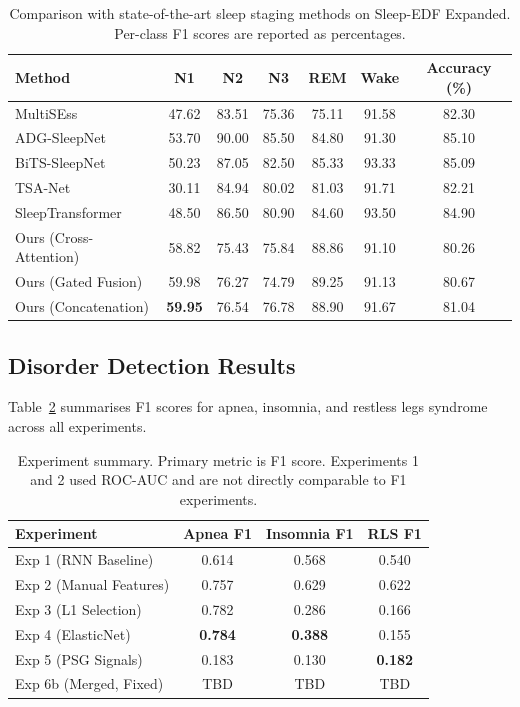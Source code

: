 \begin{table}[h]
\centering
\caption{Comparison with state-of-the-art sleep staging methods on Sleep-EDF Expanded. Per-class F1 scores are reported as percentages.}
\label{tab:sota}
\begin{tabular}{lcccccc}
\toprule
Method & N1 & N2 & N3 & REM & Wake & Accuracy (\%) \\
\midrule
MultiSEss \cite{huang2025mhas} & 47.62 & 83.51 & 75.36 & 75.11 & 91.58 & 82.30 \\
ADG-SleepNet \cite{sun2025adg} & 53.70 & 90.00 & 85.50 & 84.80 & 91.30 & 85.10 \\
BiTS-SleepNet \cite{cong2025bits} & 50.23 & 87.05 & 82.50 & 85.33 & 93.33 & 85.09 \\
TSA-Net \cite{fu2023tsanet} & 30.11 & 84.94 & 80.02 & 81.03 & 91.71 & 82.21 \\
SleepTransformer \cite{phan2022sleeptransformer} & 48.50 & 86.50 & 80.90 & 84.60 & 93.50 & 84.90 \\
\midrule
Ours (Cross-Attention) & 58.82 & 75.43 & 75.84 & 88.86 & 91.10 & 80.26 \\
Ours (Gated Fusion) & 59.98 & 76.27 & 74.79 & 89.25 & 91.13 & 80.67 \\
Ours (Concatenation) & \textbf{59.95} & 76.54 & 76.78 & 88.90 & 91.67 & 81.04 \\
\bottomrule
\end{tabular}
\end{table}

\subsection{Disorder Detection Results}

Table~\ref{tab:exp-summary} summarises F1 scores for apnea, insomnia, and restless legs syndrome across all experiments.

\begin{table}[h]
\centering
\caption{Experiment summary. Primary metric is F1 score. Experiments 1 and 2 used ROC-AUC and are not directly comparable to F1 experiments.}
\label{tab:exp-summary}
\begin{tabular}{lccc}
\toprule
Experiment & Apnea F1 & Insomnia F1 & RLS F1 \\
\midrule
Exp 1 (RNN Baseline) & 0.614 & 0.568 & 0.540 \\
Exp 2 (Manual Features) & 0.757 & 0.629 & 0.622 \\
Exp 3 (L1 Selection) & 0.782 & 0.286 & 0.166 \\
Exp 4 (ElasticNet) & \textbf{0.784} & \textbf{0.388} & 0.155 \\
Exp 5 (PSG Signals) & 0.183 & 0.130 & \textbf{0.182} \\
Exp 6b (Merged, Fixed) & TBD & TBD & TBD \\
\bottomrule
\end{tabular}
\end{table}

